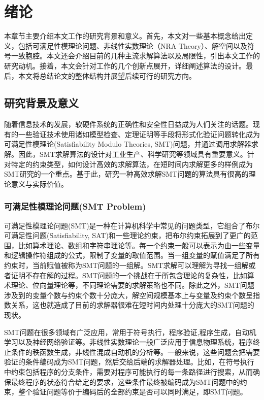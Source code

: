 \chapter{绪论}\label{chap:introduction}

本章节主要介绍本文工作的研究背景和意义。首先，本文对一些基本概念给出定义，包括可满足性模理论问题、非线性实数理论（NRA Theory）、解空间以及符号一致胞腔。本文还会介绍目前的几种主流求解算法以及局限性，引出本文工作的研究动机。接着，本文会针对工作的几个创新点展开，详细阐述算法的设计。最后，本文将总结论文的整体结构并展望后续可行的研究方向。

\section{研究背景及意义}
随着信息技术的发展，软硬件系统的正确性和安全性日益成为人们关注的话题。现有的一些验证技术使用诸如模型检查、定理证明等手段将形式化验证问题转化成为可满足性模理论(Satisfiability Modulo Theories, SMT)问题，并通过调用求解器求解。因此，SMT求解算法的设计对工业生产、科学研究等领域具有重要意义。针对特定的约束类型，如何设计高效的求解算法，在短时间内求解更多的样例成为SMT研究的一个重点。基于此，研究一种高效求解SMT问题的算法具有很高的理论意义与实际价值。

\subsection{可满足性模理论问题(SMT Problem)}
可满足性模理论问题(SMT)是一种在计算机科学中常见的问题类型，它组合了布尔可满足性问题(Satisfiability, SAT)和一些理论约束，把布尔约束拓展到了更广的范围，比如算术理论、数组和字符串理论等。每一个约束一般可以表示为由一些变量和逻辑操作符组成的公式，限制了变量的取值范围。当一组变量的赋值满足了所有约束时，当前赋值被称为SMT问题的一组解。SMT求解可以理解为寻找一组解或者证明不存在解的过程。SMT问题的一个挑战在于所包含理论的复杂性，比如算术理论、位向量理论等，不同理论需要的求解策略也不同。除此之外，SMT问题涉及到的变量个数与约束个数十分庞大，解空间规模基本上与变量及约束个数呈指数关系，这也就造成了目前的求解器很难在短时间内处理十分庞大的SMT问题的现状。

SMT问题在很多领域有广泛应用，常用于符号执行\cite{KLEE, DART}，程序验证\cite{AnalysisSymbol,VerificationSMT},程序生成\cite{synthesis1}，自动机学习\cite{Automata1,automata2}以及神经网络验证等\cite{NN1,NN2,NN3,NN4}。非线性实数理论一般广泛应用于信息物理系统\cite{CPS1,CPS2,CPS3}，程序终止条件的秩函数生成\cite{LeikeH15,HeizmannHLP13}，非线性混成自动机的分析\cite{CimattiMT12}等。一般来说，这些问题会把需要验证的条件编码成为SMT问题，然后交给后端的求解器处理。比如，在符号执行中约束包括程序的分支条件，需要对程序可能执行的每一条路径进行搜索，从而确保最终程序的状态符合给定的要求，这些条件最终被编码成为SMT问题中的约束，整个验证问题等价于编码后的全部约束是否可以同时满足，即SMT问题。

